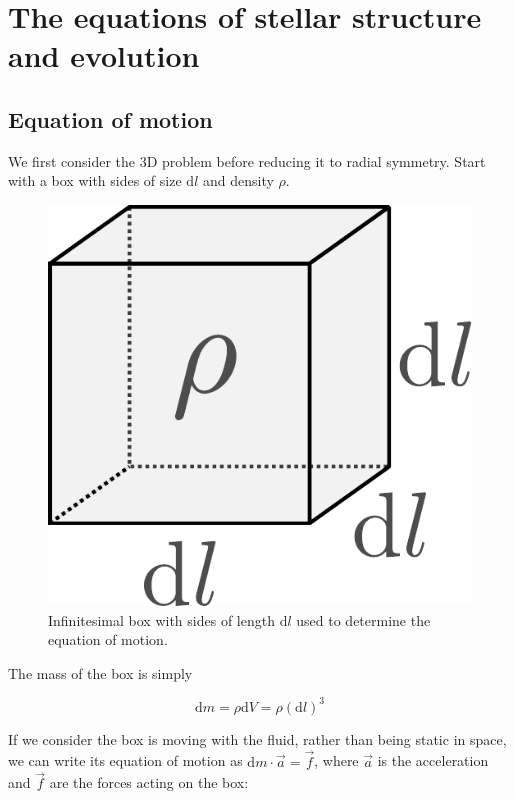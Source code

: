 \documentclass[twocolumn]{article}
\author{}
\date{}
\begin{document}
\hypertarget{the-equations-of-stellar-structure-and-evolution}{%
\section{The equations of stellar structure and
evolution}\label{the-equations-of-stellar-structure-and-evolution}}

\hypertarget{equation-of-motion}{%
\subsection{Equation of motion}\label{equation-of-motion}}

We first consider the 3D problem before reducing it to radial symmetry.
Start with a box with sides of size \(\mathrm{d}l\) and density
\(\rho\).

\begin{figure}
\centering
\includegraphics{../assets/2_equations/eom.pdf}
\caption{Infinitesimal box with sides of length \(\mathrm{d}l\) used to
determine the equation of motion.}
\end{figure}

The mass of the box is simply

\[\mathrm{d}m = \rho \mathrm{d} V = \rho(\mathrm{d}l)^3\]

If we consider the box is moving with the fluid, rather than being
static in space, we can write its equation of motion as
\(\mathrm{d}m\cdot\vec{a}=\vec{f}\), where \(\vec{a}\) is the
acceleration and \(\vec{f}\) are the forces acting on the box:
\end{document}
